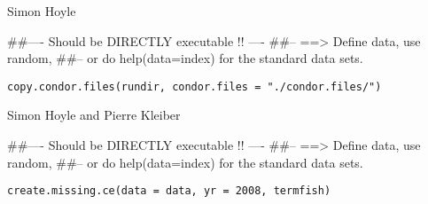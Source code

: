 \documentclass[a4paper]{book}
\begin{document}
%
\begin{Author}\relax

Simon Hoyle
\end{Author}
%
\begin{Examples}
\begin{ExampleCode}
##---- Should be DIRECTLY executable !! ----
##-- ==>  Define data, use random,
##--	or do  help(data=index)  for the standard data sets.

\end{ExampleCode}
\end{Examples}
%
\begin{Usage}
\begin{verbatim}
copy.condor.files(rundir, condor.files = "./condor.files/")
\end{verbatim}
\end{Usage}
%
\begin{Arguments}
\begin{ldescription}
\item[\code{rundir}] 


\item[\code{condor.files}] 


\end{ldescription}
\end{Arguments}
%
\begin{Author}\relax
Simon Hoyle and Pierre Kleiber

\end{Author}
%
\begin{Examples}
\begin{ExampleCode}
##---- Should be DIRECTLY executable !! ----
##-- ==>  Define data, use random,
##--	or do  help(data=index)  for the standard data sets.

\end{ExampleCode}
\end{Examples}
%
\begin{Usage}
\begin{verbatim}
create.missing.ce(data = data, yr = 2008, termfish)
\end{verbatim}
\end{Usage}
\end{document}

